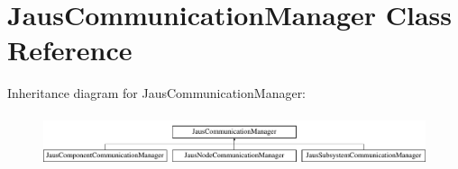 \hypertarget{class_jaus_communication_manager}{\section{\-Jaus\-Communication\-Manager \-Class \-Reference}
\label{class_jaus_communication_manager}
}
\-Inheritance diagram for \-Jaus\-Communication\-Manager\-:\begin{figure}[H]
\begin{center}
\leavevmode
\includegraphics[height=1.517615cm]{class_jaus_communication_manager}
\end{center}
\end{figure}
